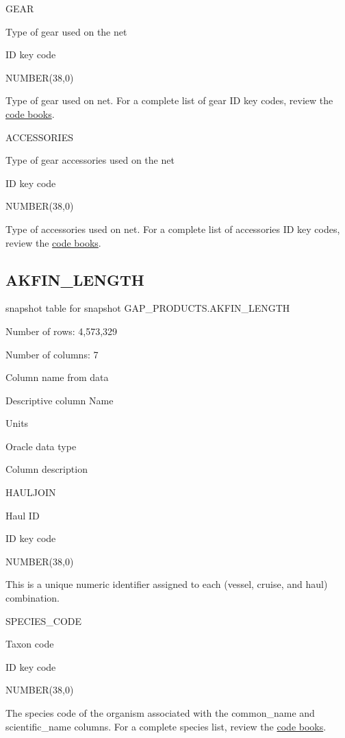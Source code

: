 \documentclass[
  letterpaper,
  oneside,
  open=any]{scrbook}
\begin{document}
GEAR

Type of gear used on the net

ID key code

NUMBER(38,0)

Type of gear used on net. For a complete list of gear ID key codes,
review the
\href{https://www.fisheries.noaa.gov/resource/document/groundfish-survey-species-code-manual-and-data-codes-manual}{code
books}.

ACCESSORIES

Type of gear accessories used on the net

ID key code

NUMBER(38,0)

Type of accessories used on net. For a complete list of accessories ID
key codes, review the
\href{https://www.fisheries.noaa.gov/resource/document/groundfish-survey-species-code-manual-and-data-codes-manual}{code
books}.

\subsection{AKFIN\_LENGTH}\label{akfin_length}

snapshot table for snapshot GAP\_PRODUCTS.AKFIN\_LENGTH

Number of rows: 4,573,329

Number of columns: 7

Column name from data

Descriptive column Name

Units

Oracle data type

Column description

HAULJOIN

Haul ID

ID key code

NUMBER(38,0)

This is a unique numeric identifier assigned to each (vessel, cruise,
and haul) combination.

SPECIES\_CODE

Taxon code

ID key code

NUMBER(38,0)

The species code of the organism associated with the common\_name and
scientific\_name columns. For a complete species list, review the
\href{https://www.fisheries.noaa.gov/resource/document/groundfish-survey-species-code-manual-and-data-codes-manual}{code
books}.
\end{document}
